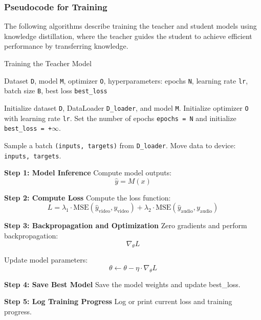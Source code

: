 \documentclass{ioereport}
\begin{document}
\pagebreak 

\subsubsection{Pseudocode for Training}
The following algorithms describe training the teacher and student models using knowledge distillation, where the teacher guides the student to achieve efficient performance by transferring knowledge.

\begin{algorithm}
    \caption{Training the Teacher Model}
    \label{alg:teacher-train-loop}
    \begin{algorithmic}[1]
        \REQUIRE Dataset \texttt{D}, model \texttt{M}, optimizer \texttt{O}, hyperparameters: epochs \texttt{N}, learning rate \texttt{lr}, batch size \texttt{B}, best loss \texttt{best\_loss}
    
        \STATE Initialize dataset \texttt{D}, DataLoader \texttt{D\_loader}, and model \texttt{M}.
        \STATE Initialize optimizer \texttt{O} with learning rate \texttt{lr}.
        \STATE Set the number of epochs \texttt{epochs = N} and initialize \texttt{best\_loss = +$\infty$}.
    
            \STATE Sample a batch \texttt{(inputs, targets)} from \texttt{D\_loader}.
            \STATE Move data to device: \texttt{inputs, targets}.
    
            \STATE \textbf{Step 1: Model Inference}
            \STATE Compute model outputs:
            \[
            \hat{y} = M(x)
            \]
    
            \STATE \textbf{Step 2: Compute Loss}
            \STATE Compute the loss function:
            \[
            L = \lambda_1 \cdot \text{MSE}(\hat{y}_\text{video}, y_\text{video}) + \lambda_2 \cdot \text{MSE}(\hat{y}_\text{audio}, y_\text{audio})
            \]
         
    
            \STATE \textbf{Step 3: Backpropagation and Optimization}
            \STATE Zero gradients and perform backpropagation:
            \[
            \nabla_{\theta} L
            \]

            \STATE Update model parameters:
            \[
            \theta \gets \theta - \eta \cdot \nabla_{\theta} L
            \]
    
            \STATE \textbf{Step 4: Save Best Model}
                \STATE Save the model weights and update best\_loss.
            \ENDIF
    
            \STATE \textbf{Step 5: Log Training Progress}
            \STATE Log or print current loss and training progress.
        \ENDFOR
    \end{algorithmic}
\end{algorithm}
\end{document}
